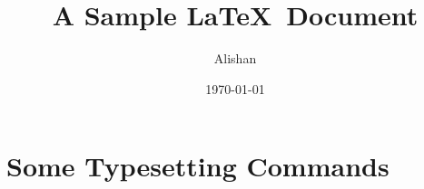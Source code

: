 

\title{A Sample \LaTeX ~Document}		%

\author{Alishan}					%

\date{\today}				%


\maketitle		%

\section{Some Typesetting Commands}		%
									
